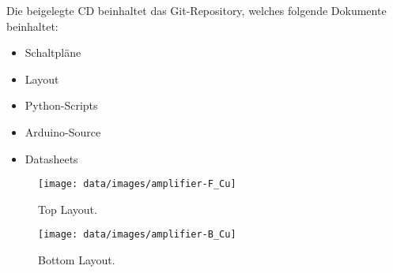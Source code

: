 \documentclass{fhnwreport} %
\begin{document}
\clearpage
\begin{appendices}

Die beigelegte CD beinhaltet das Git-Repository, welches folgende Dokumente beinhaltet:
  
  \begin{itemize}
    \item Schaltpläne\\
    \item Layout\\
    \item Python-Scripts\\
    \item Arduino-Source\\
    \item Datasheets
  \end{itemize}


\begin{figure}[H]
\begin{center}
  \texttt{[image: data/images/amplifier-F\_Cu]}
  \caption{Top Layout.}
  \label{fig:top}
\end{center}
\end{figure}

\begin{figure}[H]
\begin{center}
  \texttt{[image: data/images/amplifier-B\_Cu]}
  \caption{Bottom Layout.}
  \label{fig:bot}
\end{center}
\end{figure}







\end{appendices}

\clearpage

\end{document}
